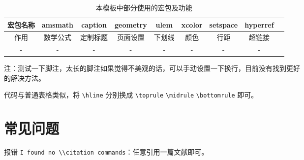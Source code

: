 \documentclass{NauThesis}
\begin{document}
\begin{table}[htbp!]
    \centering
    \caption{本模板中部分使用的宏包及功能}
    \label{table_1}
    \begin{tabular}{ccccccccc}
        \toprule
        宏包名称 & amsmath  & caption  & geometry & ulem   & xcolor & setspace & hyperref \\
        \midrule
        作用     & 数学公式 & 定制标题 & 页面设置 & 下划线 & 颜色   & 行距     & 超链接   \\
        -        & -        & -        & -        & -      & -      & -        & -        \\
        \bottomrule
    \end{tabular}
    
    \begin{tablenotes}
        \item {} 注：测试一下脚注，太长的脚注如果觉得不美观的话，可以手动设置一下换行，目前没有找到更好\\的解决方法。
    \end{tablenotes}
\end{table}

代码与普通表格类似，将 \verb|\hline| 分别换成 \verb|\toprule| \verb|\midrule| \verb|\bottomrule| 即可。

\chapter{常见问题}
报错 \verb|I found no \\citation commands|：任意引用一篇文献即可。








\end{document}
